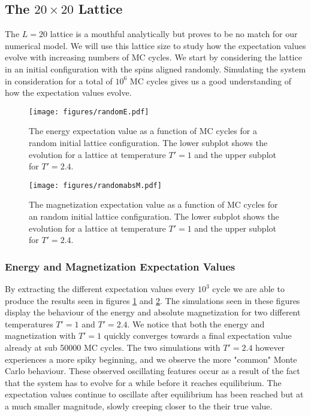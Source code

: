 \documentclass[a4paper, 10pt, reqno]{amsart}
\begin{document}
\subsection{The $20 \times 20$ Lattice} The $L=20$ lattice is a mouthful analytically but proves to be no match for our numerical model. We will use this lattice size to study how the expectation values evolve with increasing numbers of MC cycles. We start by considering the lattice in an initial configuration with the spins aligned randomly. Simulating the system in consideration for a total of $10^6$ MC cycles gives us a good understanding of how the expectation values evolve.

\begin{figure}
    \centering
    \texttt{[image: figures/randomE.pdf]}
    \caption{The energy expectation value as a function of MC cycles for a random initial lattice configuration. The lower subplot shows the evolution for a lattice at temperature $T'=1$ and the upper subplot for $T'=2.4$.}
    \label{fig: 20x20 random <E> }
\end{figure}

\begin{figure}
    \centering
    \texttt{[image: figures/randomabsM.pdf]}
    \caption{The magnetization expectation value as a function of MC cycles for an random initial lattice configuration. The lower subplot shows the evolution for a lattice at temperature $T'=1$ and the upper subplot for $T'=2.4$.}
    \label{fig: 20x20 random <absM> }
\end{figure}

\subsubsection{Energy and Magnetization Expectation Values} By extracting the different expectation values every $10^3$ cycle we are able to produce the results seen in figures \ref{fig: 20x20 random <E> } and \ref{fig: 20x20 random <absM> }. The simulations seen in these figures display the behaviour of the energy and absolute magnetization for two different temperatures $T'=1$ and $T'=2.4$. We notice that both the energy and magnetization with $T' = 1$ quickly converges towards a final expectation value already at sub 50000 MC cycles. The two simulations with $T' = 2.4$ however experiences a more spiky beginning, and we observe the more "common" Monte Carlo behaviour. These observed oscillating features occur as a result of the fact that the system has to evolve for a while before it reaches equilibrium. The expectation values continue to oscillate after equilibrium has been reached but at a much smaller magnitude, slowly creeping closer to the their true value.
\end{document}
